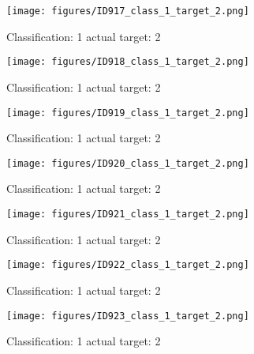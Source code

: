 \begin{figure}[h!]
\begin{center}
\texttt{[image: figures/ID917\_class\_1\_target\_2.png]}
\end{center}
\caption{ Classification: 1 actual target: 2}
\label{fig:ID917_class_1_target_2}
\end{figure}
\begin{figure}[h!]
\begin{center}
\texttt{[image: figures/ID918\_class\_1\_target\_2.png]}
\end{center}
\caption{ Classification: 1 actual target: 2}
\label{fig:ID918_class_1_target_2}
\end{figure}
\begin{figure}[h!]
\begin{center}
\texttt{[image: figures/ID919\_class\_1\_target\_2.png]}
\end{center}
\caption{ Classification: 1 actual target: 2}
\label{fig:ID919_class_1_target_2}
\end{figure}
\begin{figure}[h!]
\begin{center}
\texttt{[image: figures/ID920\_class\_1\_target\_2.png]}
\end{center}
\caption{ Classification: 1 actual target: 2}
\label{fig:ID920_class_1_target_2}
\end{figure}
\begin{figure}[h!]
\begin{center}
\texttt{[image: figures/ID921\_class\_1\_target\_2.png]}
\end{center}
\caption{ Classification: 1 actual target: 2}
\label{fig:ID921_class_1_target_2}
\end{figure}
\begin{figure}[h!]
\begin{center}
\texttt{[image: figures/ID922\_class\_1\_target\_2.png]}
\end{center}
\caption{ Classification: 1 actual target: 2}
\label{fig:ID922_class_1_target_2}
\end{figure}
\begin{figure}[h!]
\begin{center}
\texttt{[image: figures/ID923\_class\_1\_target\_2.png]}
\end{center}
\caption{ Classification: 1 actual target: 2}
\label{fig:ID923_class_1_target_2}
\end{figure}
